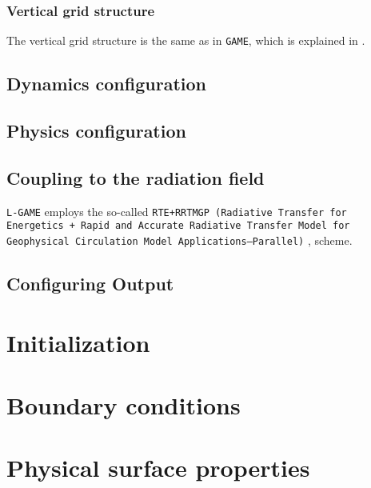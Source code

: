 \documentclass[10pt]{report}
\begin{document}
\subsection{Vertical grid structure}
\label{sec:vertical_grid_structure}

The vertical grid structure is the same as in \texttt{GAME}, which is explained in \cite{game_handbook}.

\section{Dynamics configuration}
\label{sec:dynamics_configuration}

\section{Physics configuration}
\label{sec:physics_configuration}

\section{Coupling to the radiation field}
\label{sec:coupling_to_the_radiation_field}

\texttt{L-GAME} employs the so-called \texttt{RTE+RRTMGP (Radiative Transfer for Energetics + Rapid and Accurate Radiative Transfer Model for Geophysical Circulation Model Applications—Parallel)} \cite{doi:10.1029/2019MS001621}, \cite{rte-rrtmgp-github} scheme.

\section{Configuring Output}
\label{sec:configuring_output}

\chapter{Initialization}
\label{sec:initialization}

\chapter{Boundary conditions}
\label{chap:boundary_conditions}

\chapter{Physical surface properties}
\label{sec:physical_surface_properties}
\end{document}
